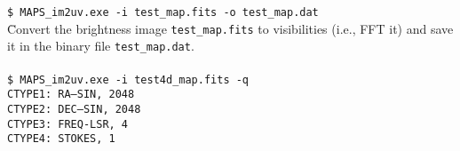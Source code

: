 \documentclass[letterpaper, twoside, 12pt]{article}
\begin{document}
\begin{tabbing}
{\tt \$ MAPS\_im2uv.exe -i test\_map.fits -o test\_map.dat} \\
   \hspace{10mm} \=  Convert the brightness image {\tt test\_map.fits} to 
visibilities (i.e., FFT it) and save \\ 
   \> it in the binary file {\tt test\_map.dat}.\\
\\
{\tt \$ MAPS\_im2uv.exe -i test4d\_map.fits -q} \\
{\tt CTYPE1: RA---SIN,       2048} \\
{\tt CTYPE2: DEC--SIN,       2048} \\
{\tt CTYPE3: FREQ-LSR,       4} \\
{\tt CTYPE4: STOKES,         1} \\


\end{tabbing}
\end{document}
